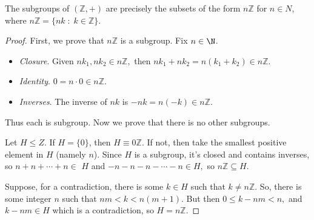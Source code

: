 \documentclass[a4paper]{scrartcl}
\begin{document}
\begin{theorem}\label{thm:subgroups-of-z}
	The subgroups of $(\mathbb{Z}, +)$ are precisely the subsets of the form $n \mathbb{Z}$ for $n \in N$, where $n\mathbb{Z} = \{n k \; : \; k \in \mathbb{Z}\}$.
\end{theorem}
\begin{proof}
	First, we prove that $n \mathbb{Z}$ is a subgroup. Fix $n \in \N$.
	\begin{itemize}
		\item \emph{Closure}. Given $n k_{1}, n k_{2} \in n \mathbb{Z},$ then $n k_{1}+n k_{2}=n\left(k_{1}+k_{2}\right) \in n \mathbb{Z}$.
		\item \emph{Identity}. $0 =n \cdot 0 \in n \mathbb{Z}$.
		\item \emph{Inverses}. The inverse of $n k$ is $-n k=n(-k) \in n \mathbb{Z}$.
	\end{itemize}
Thus each is subgroup. Now we prove that there is no other subgroups.

Let $H \leq Z$. If $H=\{0\}$, then $H \equiv 0 \mathbb{Z}$. If not, then take the smallest positive element in $H$ (namely $n$). Since $H$ is a subgroup, it's closed and contains inverses, so $n+n+\cdots+n \in$ $H$ and $-n-n-n-\cdots-n \in H,$ so $n \mathbb{Z} \subseteq H$.

Suppose, for a contradiction, there is some $k \in H$ such that $k \neq n \mathbb{Z} .$ So, there is some integer $n$ such that $n m<k<n(m+1) .$ But then $0 \leq k-n m<n,$ and $k-n m \in H$ which is a contradiction, so $H=n \mathbb{Z}$.
\end{proof}
\end{document}
